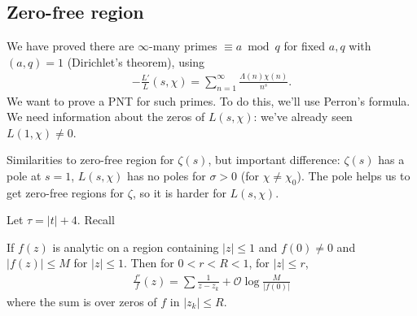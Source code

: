 \documentclass{article}
\newcommand{\1}{\mathbbm{1}}
\newcommand{\bigO}{\mathcal{O}}
\begin{document}
\subsection{Zero-free region}
\newlec
We have proved there are $\infty$-many primes $\equiv a \bmod{q}$ for fixed $a,q$ with $(a,q) = 1$ (Dirichlet's theorem), using
\begin{align*}
  -\frac{L'}{L}(s,\chi) = \sum_{n=1}^\infty \frac{\Lambda(n) \chi(n)}{n^s}.
\end{align*}
We want to prove a PNT for such primes. To do this, we'll use Perron's formula.
We need information about the zeros of $L(s,\chi)$: we've already seen $L(1,\chi) \neq 0$.

Similarities to zero-free region for $\zeta(s)$, but important difference: $\zeta(s)$ has a pole at $s=1$, $L(s,\chi)$ has no poles for $\sigma > 0$ (for $\chi \neq \chi_0$).
The pole helps us to get zero-free regions for $\zeta$, so it is harder for $L(s,\chi)$.

Let $\tau = |t| + 4$.
Recall
\begin{lemma}
  If $f(z)$ is analytic on a region containing $|z| \leq 1$ and $f(0) \neq 0$ and $|f(z)| \leq M$ for $|z| \leq 1$.
  Then for $0 < r < R < 1$, for $|z| \leq r$,
  \begin{align*}
  \frac{f'}{f}(z) = \sum \frac{1}{z-z_k} + \bigO \log \frac{M}{|f(0)|}
  \end{align*}
  where the sum is over zeros of $f$ in $|z_k| \leq R$.
\end{lemma}
\end{document}
